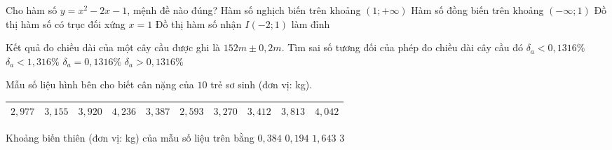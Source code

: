 \begin{ex}%
	Cho hàm số $y=x^2-2x-1$, mệnh đề nào đúng?
	\choice
	{Hàm số nghịch biến trên khoảng $(1;+\infty)$}
	{Hàm số đồng biến trên khoảng $(-\infty;1)$}
	{\True Đồ thị hàm số có trục đối xứng $x=1$}
	{Đồ thị hàm số nhận $I(-2;1)$ làm đỉnh}
\end{ex}

\begin{ex}%
	Kết quả đo chiều dài của một cây cầu được ghi là $152m\pm 0,2m$. Tìm sai số tương đối của phép đo chiều dài cây cầu đó
	\choice
	{\True $\delta_a<0,1316\%$}
	{$\delta_a<1,316\%$}
	{$\delta_a=0,1316\%$}
	{$\delta_a>0,1316\%$}
\end{ex}

\begin{ex}%
	Mẫu số liệu hình bên cho biết cân nặng của $10$ trẻ sơ sinh (đơn vị: kg).
	\begin{center}
		\begin{tabular}{|c|c|c|c|c|c|c|c|c|c|}
			\hline
			$2{,}977$ & $3{,}155$ & $3{,}920$ & $4{,}236$ & $3{,}387$ & $2{,}593$ & $3{,}270$ & $3{,}412$ & $3{,}813$ & $4{,}042$ \\
			\hline
		\end{tabular}
	\end{center}
	Khoảng biến thiên (đơn vị: kg) của mẫu số liệu trên bằng
	\choice
	{$0{,}384$}
	{$0{,}194$}
	{\True $1{,}643$}
	{$3$}
\end{ex}


